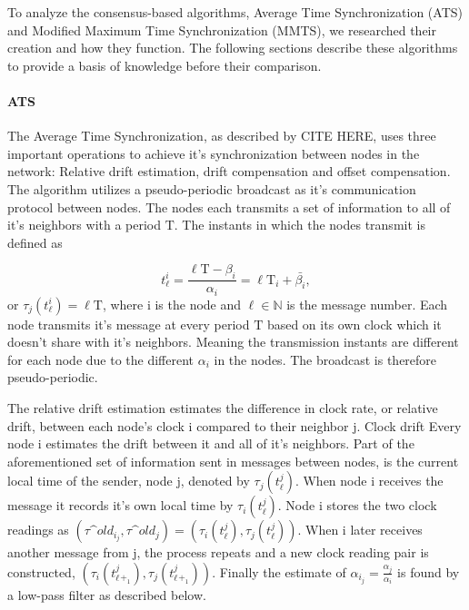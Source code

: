 \documentclass[a4paper,12pt]{article}
\begin{document}
    To analyze the consensus-based algorithms, Average Time Synchronization (ATS) and Modified Maximum Time Synchronization (MMTS), we researched their creation and how they function. The following sections describe these algorithms to provide a basis of knowledge before their comparison.
    
    \paragraph{ATS} The Average Time Synchronization, as described by CITE HERE, uses three important operations to achieve it's synchronization between nodes in the network: Relative drift estimation, drift compensation and offset compensation. The algorithm utilizes a pseudo-periodic broadcast as it's communication protocol between nodes. The nodes each transmits a set of information to all of it's neighbors with a period $\mathrm{T}$. The instants in which the nodes transmit is defined as 
    
    \begin{equation}
        t^i_\ell = \frac{\ell\mathrm{T} - \beta_i}{\alpha_i} = \ell\mathrm{T}_i + \bar{\beta_i},
    \end{equation}
    or $\tau_j(t^i_\ell) = \ell\mathrm{T}$, where i is the node and $\ell \in \mathbb{N}$ is the message number. Each node transmits it's message at every period $\mathrm{T}$ based on its own clock which it doesn't share with it's neighbors. Meaning the transmission instants are different for each node due to the different $\alpha_i$ in the nodes. The broadcast is therefore pseudo-periodic.
    
    
    The relative drift estimation estimates the difference in clock rate, or relative drift, between each node's clock i compared to their neighbor j. Clock drift  Every node i estimates the drift between it and all of it's neighbors. Part of the aforementioned set of information sent in messages between nodes, is the current local time of the sender, node j, denoted by $\tau_j(t^j_\ell)$. When node i receives the message it records it's own local time by $\tau_i(t^j_\ell)$. Node i stores the two clock readings as $(\tau\^{old}_i_j, \tau\^{old}_j) = (\tau_i(t^j_\ell), \tau_j(t^j_\ell))$. When i later receives another message from j, the process repeats and a new clock reading pair is constructed, $(\tau_i(t^j_\ell_+_1), \tau_j(t^j_\ell_+_1))$. Finally the estimate of $\alpha_i_j = \frac{\alpha_j}{\alpha_i}$ is found by a low-pass filter as described below.
    
\end{document}
